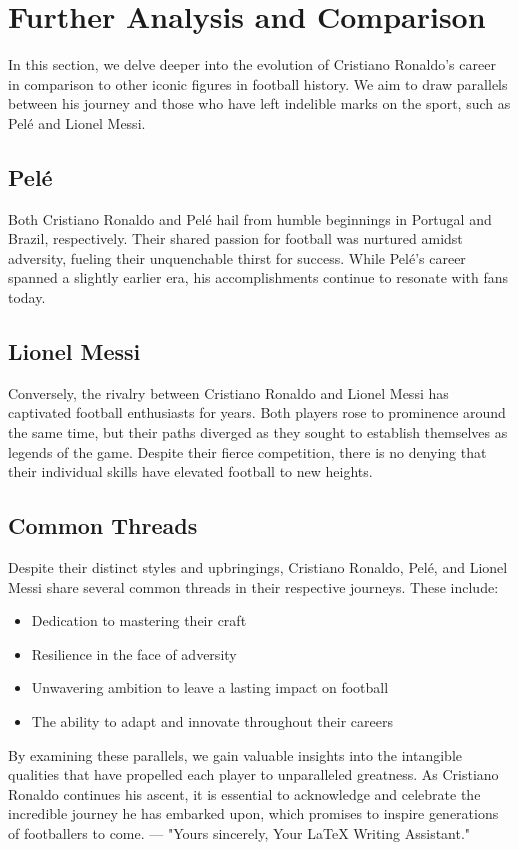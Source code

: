 \documentclass{article}
\begin{document}
\section*{Further Analysis and Comparison} In this section, we delve deeper into the evolution of Cristiano Ronaldo's career in comparison to other iconic figures in football history. We aim to draw parallels between his journey and those who have left indelible marks on the sport, such as Pelé and Lionel Messi. \subsection*{Pelé} Both Cristiano Ronaldo and Pelé hail from humble beginnings in Portugal and Brazil, respectively. Their shared passion for football was nurtured amidst adversity, fueling their unquenchable thirst for success. While Pelé's career spanned a slightly earlier era, his accomplishments continue to resonate with fans today. \subsection*{Lionel Messi} Conversely, the rivalry between Cristiano Ronaldo and Lionel Messi has captivated football enthusiasts for years. Both players rose to prominence around the same time, but their paths diverged as they sought to establish themselves as legends of the game. Despite their fierce competition, there is no denying that their individual skills have elevated football to new heights. \subsection*{Common Threads} Despite their distinct styles and upbringings, Cristiano Ronaldo, Pelé, and Lionel Messi share several common threads in their respective journeys. These include: \begin{itemize} \item Dedication to mastering their craft \item Resilience in the face of adversity \item Unwavering ambition to leave a lasting impact on football \item The ability to adapt and innovate throughout their careers \end{itemize} By examining these parallels, we gain valuable insights into the intangible qualities that have propelled each player to unparalleled greatness. As Cristiano Ronaldo continues his ascent, it is essential to acknowledge and celebrate the incredible journey he has embarked upon, which promises to inspire generations of footballers to come. --- "Yours sincerely, Your LaTeX Writing Assistant."
\end{document}
